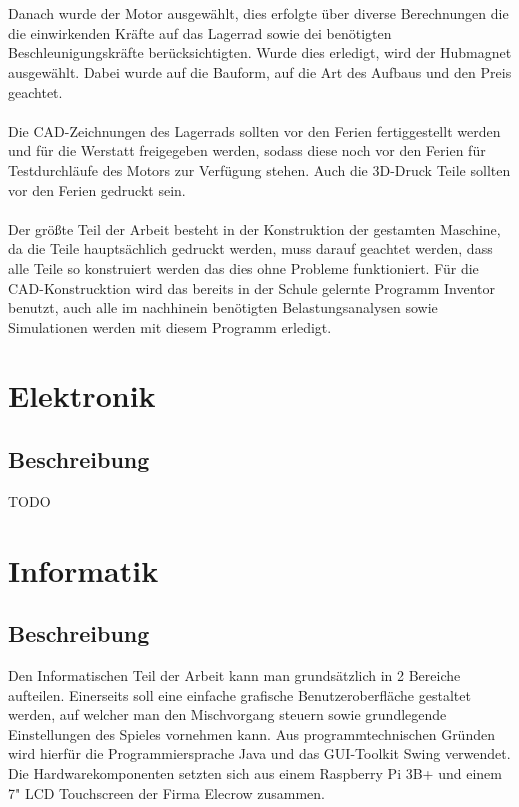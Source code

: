\\\\
Danach wurde der Motor ausgewählt, dies erfolgte über diverse Berechnungen die die einwirkenden Kräfte auf das Lagerrad sowie dei benötigten Beschleunigungskräfte berücksichtigten.
Wurde dies erledigt, wird der Hubmagnet ausgewählt. Dabei wurde auf die Bauform, auf die Art des Aufbaus und den Preis geachtet.
\\\\
Die CAD-Zeichnungen des Lagerrads sollten vor den Ferien fertiggestellt werden und für die Werstatt freigegeben werden, sodass diese noch vor den Ferien für Testdurchläufe des Motors zur Verfügung stehen.
Auch die 3D-Druck Teile sollten vor den Ferien gedruckt sein.
\\\\
Der größte Teil der Arbeit besteht in der Konstruktion der gestamten Maschine, da die Teile hauptsächlich gedruckt werden, muss darauf geachtet werden, dass alle Teile so konstruiert werden das dies ohne Probleme funktioniert.
Für die CAD-Konstrucktion wird das bereits in der Schule gelernte Programm Inventor benutzt, auch alle im nachhinein benötigten Belastungsanalysen sowie Simulationen werden mit diesem Programm erledigt.


\chapter{Elektronik}
\label{sec:Elektronik}
\section{Beschreibung}

TODO



\chapter{Informatik}
\label{sec:Informatik}
\section{Beschreibung}

Den Informatischen Teil der Arbeit kann man grundsätzlich in 2 Bereiche aufteilen. Einerseits soll eine einfache grafische Benutzeroberfläche gestaltet werden, auf welcher man den Mischvorgang steuern sowie grundlegende Einstellungen des Spieles vornehmen kann.
Aus programmtechnischen Gründen wird hierfür die Programmiersprache Java und das GUI-Toolkit Swing verwendet. \\
Die Hardwarekomponenten setzten sich aus einem Raspberry Pi 3B+ und einem 7" LCD Touchscreen der Firma Elecrow zusammen. \\

